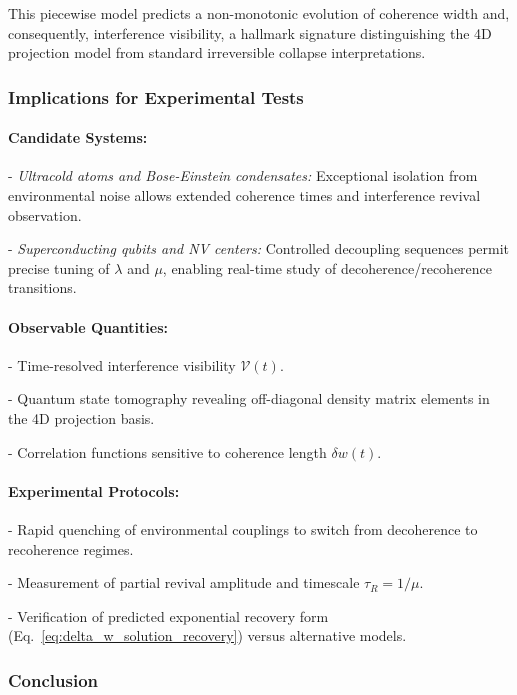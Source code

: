 \documentclass[12pt]{article}
\begin{document}
This piecewise model predicts a non-monotonic evolution of coherence width and, consequently, interference visibility, a hallmark signature distinguishing the 4D projection model from standard irreversible collapse interpretations.

\subsubsection*{Implications for Experimental Tests}

\paragraph{Candidate Systems:} 

- \emph{Ultracold atoms and Bose-Einstein condensates:} Exceptional isolation from environmental noise allows extended coherence times and interference revival observation.

- \emph{Superconducting qubits and NV centers:} Controlled decoupling sequences permit precise tuning of \(\lambda\) and \(\mu\), enabling real-time study of decoherence/recoherence transitions.

\paragraph{Observable Quantities:} 

- Time-resolved interference visibility \(\mathcal{V}(t)\).

- Quantum state tomography revealing off-diagonal density matrix elements in the 4D projection basis.

- Correlation functions sensitive to coherence length \(\delta w(t)\).

\paragraph{Experimental Protocols:} 

- Rapid quenching of environmental couplings to switch from decoherence to recoherence regimes.

- Measurement of partial revival amplitude and timescale \(\tau_R = 1/\mu\).

- Verification of predicted exponential recovery form (Eq.~\eqref{eq:delta_w_solution_recovery}) versus alternative models.

\subsubsection*{Conclusion}
\end{document}
